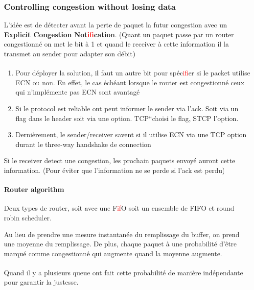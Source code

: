 \subsubsection{Controlling congestion without losing data}
L'idée est de détecter avant la perte de paquet la futur congestion avec un
\textbf{Explicit Congestion Not\textcolor{red}{if}ication}. (Quant un paquet passe par un router
congestionné on met le bit à 1 et quand le receiver à cette information il la
transmet au sender pour adapter son débit)

\paragraph{}
\begin{enumerate}
    \item Pour déployer la solution, il faut un autre bit pour spéc\textcolor{red}{if}ier si le packet utilise
        ECN ou non. En effet, le cas échéant lorsque le router est congestionné ceux qui
        n'implémente pas ECN sont avantagé
    \item Si le protocol est reliable ont peut informer le sender via l'ack. Soit via
        un flag dans le header soit via une option. TCP``choisi le flag, STCP l'option.
    \item Dernièrement, le sender/receiver savent si il utilise ECN via une TCP option
        durant le three-way handshake de connection
\end{enumerate}

Si le receiver detect une congestion, les prochain paquets envoyé auront cette information.
(Pour éviter que l'information ne se perde si l'ack est perdu)

\paragraph{Router algorithm}
Deux types de router, soit avec une F\textcolor{red}{if}O soit un ensemble de FIFO et round robin scheduler.

Au lieu de prendre une mesure instantanée du remplissage du buffer, on prend une moyenne
du remplissage.
De plus, chaque paquet à une probabilité d'être marqué comme congestionné qui augmente
quand la moyenne augmente.

\paragraph{}
Quand il y a plusieurs queue ont fait cette probabilité de manière indépendante pour
garantir la justesse.

